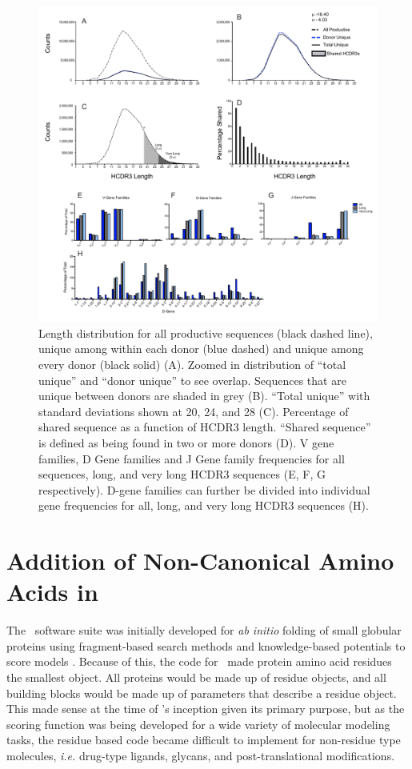 \begin{figure}[!t]
   \centering
   \includegraphics[width=\linewidth]{images/chapter3/figure3_7.pdf} %
   \caption[Distribution and VDJ Gene Usage]{Length distribution for all productive sequences (black dashed line), unique among within each donor (blue dashed) and unique among every donor (black solid) (A). Zoomed in distribution of ``total unique'' and ``donor unique'' to see overlap. Sequences that are unique between donors are shaded in grey (B). ``Total unique'' with standard deviations shown at 20, 24, and 28 (C). Percentage of shared sequence as a function of HCDR3 length. ``Shared sequence'' is defined as being found in two or more donors (D). V gene families, D Gene families and J Gene family frequencies for all sequences, long, and very long HCDR3 sequences (E, F, G respectively). D-gene families can further be divided into individual gene frequencies for all, long, and very long HCDR3 sequences (H).}
   \label{fig:figure3_7}
\end{figure}



\section{Addition of Non-Canonical Amino Acids in \rosetta}
The \rosetta~software suite was initially developed for \textit{ab initio} folding of small globular proteins using fragment-based search methods and knowledge-based potentials to score models \citep{Simons:1997do}. Because of this, the code for \rosetta~made protein amino acid residues the smallest object. All proteins would be made up of residue objects, and all building blocks would be made up of parameters that describe a residue object. This made sense at the time of \rosetta's inception given its primary purpose, but as the scoring function was being developed for a wide variety of molecular modeling tasks, the residue based code became difficult to implement for non-residue type molecules, \textit{i.e.} drug-type ligands, glycans, and post-translational modifications.

